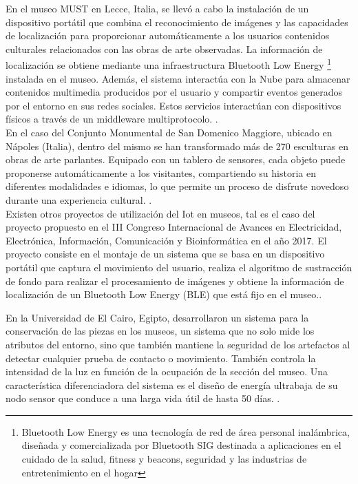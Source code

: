         En el museo MUST en Lecce, Italia, se llevó a cabo la instalación de un dispositivo portátil que combina el reconocimiento de imágenes y las capacidades de localización para proporcionar automáticamente a los usuarios contenidos culturales relacionados con las obras de arte observadas. La información de localización se obtiene mediante una infraestructura Bluetooth Low Energy \footnote{Bluetooth Low Energy es una tecnología de red de área personal inalámbrica, diseñada y comercializada por Bluetooth SIG destinada a aplicaciones en el cuidado de la salud, fitness y beacons, seguridad y las industrias de entretenimiento en el hogar} instalada en el museo. Además, el sistema interactúa con la Nube para almacenar contenidos multimedia producidos por el usuario y compartir eventos generados por el entorno en sus redes sociales. Estos servicios interactúan con dispositivos físicos a través de un middleware multiprotocolo. \cite{museoItalia}.\\

        En el caso del Conjunto Monumental de San Domenico Maggiore, ubicado en Nápoles (Italia), dentro del mismo se han transformado más de 270 esculturas en obras de arte parlantes. Equipado con un tablero de sensores, cada objeto puede proponerse automáticamente a los visitantes, compartiendo su historia en diferentes modalidades e idiomas, lo que permite un proceso de disfrute novedoso durante una experiencia cultural. \cite{monumentoSanDomenico}.\\
        
        Existen otros proyectos de utilización del Iot en museos, tal es el caso del proyecto propuesto en el III Congreso Internacional de Avances en Electricidad, Electrónica, Información, Comunicación y Bioinformática en el año 2017. El proyecto consiste en el montaje de un sistema que se basa en un dispositivo portátil que captura el movimiento del usuario, realiza el algoritmo de sustracción de fondo para realizar el procesamiento de imágenes y obtiene la información de localización de un Bluetooth Low Energy (BLE) que está fijo en el museo.\cite{proyectoIotdispositivoPortatil}.

        En la Universidad de El Cairo, Egipto, desarrollaron un sistema para la conservación de las piezas en los museos, un sistema que no solo mide los atributos del entorno, sino que también mantiene la seguridad de los artefactos al detectar cualquier prueba de contacto o movimiento. También controla la intensidad de la luz en función de la ocupación de la sección del museo. Una característica diferenciadora del sistema es el diseño de energía ultrabaja de su nodo sensor que conduce a una larga vida útil de hasta 50 días. \cite{ultraLowPowerConservacion}.\\
                
